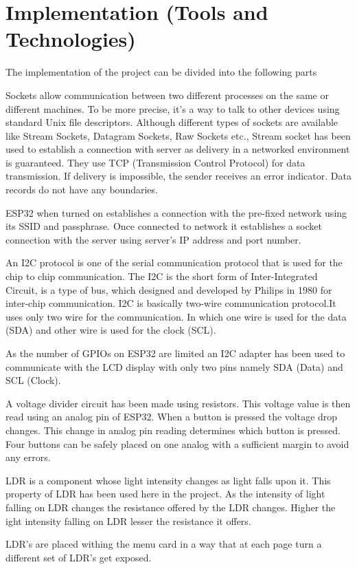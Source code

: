 \documentclass[12pt,a4paper]{article}
\begin{document}
        \section{Implementation (Tools and Technologies)}
        The implementation of the project can be divided into the following parts
        \begin{info}
        Sockets allow communication between two different processes on the same or different machines. To be more precise, it's a way to talk to other devices using standard Unix file descriptors. Although different types of sockets are available like Stream Sockets, Datagram Sockets, Raw Sockets etc., Stream socket has been used to establish a connection with server as delivery in a networked environment is guaranteed. They use TCP (Transmission Control Protocol) for data transmission. If delivery is impossible, the sender receives an error indicator. Data records do not have any boundaries.
        
        ESP32 when turned on establishes a connection with the pre-fixed network using its SSID and passphrase. Once connected to network it establishes a socket connection with the server using server's IP address and port number.
		\end{info}	
		\begin{info}
		An I2C protocol is one of the serial communication protocol that is used for the chip to chip communication. The I2C is the short form of Inter-Integrated Circuit, is a type of bus, which designed and developed by Philips in 1980 for inter-chip communication. I2C is basically two-wire communication protocol.It uses only two wire for the communication. In which one wire is used for the data (SDA) and other wire is used for the clock (SCL).
		
		As the number of GPIOs on ESP32 are limited an I2C adapter has been used to communicate with the LCD display with only two pins namely SDA (Data) and SCL (Clock).
		\end{info}
		\begin{info}
			A voltage divider circuit has been made using resistors. This voltage value is then read using an analog pin of ESP32. When a button is pressed the voltage drop changes. This change in analog pin reading determines which button is pressed. Four buttons can be safely placed on one analog with a sufficient margin to avoid any errors.
		\end{info}
		\begin{info}
		LDR is a component whose light intensity changes as light falls upon it. This property of LDR has been used here in the project. As the intensity of light falling on LDR changes the resistance offered by the LDR changes. Higher the ight intensity falling on LDR lesser the resistance it offers. 
		
		LDR's are placed withing the menu card in a way that at each page turn a different set of LDR's get exposed.
		\end{info}
\end{document}
